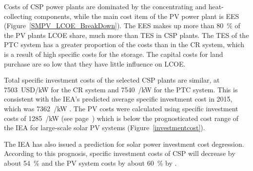 Costs of CSP power plants are dominated by the concentrating and heat-collecting components, while the main cost item of the PV power plant is EES (Figure~\ref{SMPV_LCOE_BreakDown}). The EES makes up more than \SI{80}{\percent} of the PV plants LCOE share, much more than TES in CSP plants. The TES of the PTC system has a greater proportion of the costs than in the CR system, which is a result of high specific costs for the storage. The capital costs for land purchase are so low that they have little influence on LCOE. 


Total specific investment costs of the selected CSP plants are similar, at \SI{7503}{USD/kW} for the CR system and \SI{7540}{\usd/\kilo\watt} for the PTC system. This is consistent with the IEA's predicted average specific investment cost in 2015, which was \SI{7362}{\usd/\kilo\watt} \cite{IEA2014c}. The PV costs were calculated using specific investment costs of \SI{1285}{\usd/\kilo\watt} (see page~\pageref{SUBSUBPVFinancialparameter}) which is below the prognosticated cost range of the IEA for large-scale solar PV systems (Figure~\ref{investmentcost}). 


The IEA has also issued a prediction for solar power investment cost degression. According to this prognosis, specific investment costs of CSP will decrease by about \SI{54}{\percent} and the PV system costs by about \SI{60}{\percent} by \cite{IEA2014c}.

